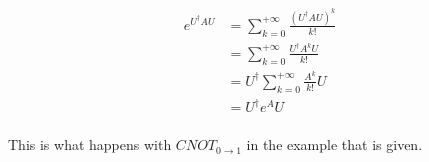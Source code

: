 \documentclass{article}
\begin{document}
\begin{align*}
e^{U^{\dagger}AU} &= \sum_{k=0}^{+\infty} \frac{(U^{\dagger}AU)^{k}}{k!} \\ 
&= \sum_{k=0}^{+\infty} \frac{U^{\dagger}A^{k}U}{k!} \\ 
&= U^{\dagger}\sum_{k=0}^{+\infty} \frac{A^{k}}{k!}U \\ 
&= U^{\dagger}e^{A}U \\ 
\end{align*}

This is what happens with $CNOT_{0\rightarrow 1}$
in the example that is given.



\end{document}
